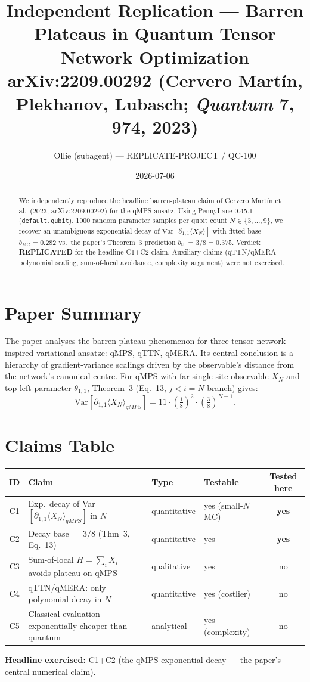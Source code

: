\documentclass[11pt]{article}
\title{Independent Replication --- Barren Plateaus in Quantum Tensor Network Optimization\\
\large arXiv:2209.00292 (Cervero Mart\'in, Plekhanov, Lubasch; \emph{Quantum} 7, 974, 2023)}
\author{Ollie (subagent) --- REPLICATE-PROJECT / QC-100}
\date{2026-07-06}
\begin{document}
\maketitle

\begin{abstract}
We independently reproduce the headline barren-plateau claim of Cervero Mart\'in et al.\ (2023, arXiv:2209.00292) for the qMPS ansatz. Using PennyLane 0.45.1 (\texttt{default.qubit}), 1000 random parameter samples per qubit count $N \in \{3,\dots,9\}$, we recover an unambiguous exponential decay of $\mathrm{Var}[\partial_{1,1}\langle X_N\rangle]$ with fitted base $b_\mathrm{MC} = 0.282$ vs.\ the paper's Theorem~3 prediction $b_\mathrm{th} = 3/8 = 0.375$. Verdict: \textbf{REPLICATED} for the headline C1+C2 claim. Auxiliary claims (qTTN/qMERA polynomial scaling, sum-of-local avoidance, complexity argument) were not exercised.
\end{abstract}

\section{Paper Summary}
The paper analyses the barren-plateau phenomenon for three tensor-network-inspired variational ansatze: qMPS, qTTN, qMERA. Its central conclusion is a hierarchy of gradient-variance scalings driven by the observable's distance from the network's canonical centre. For qMPS with far single-site observable $X_N$ and top-left parameter $\theta_{1,1}$, Theorem~3 (Eq.~13, $j<i=N$ branch) gives:
\begin{equation}
\mathrm{Var}\left[\partial_{1,1}\langle X_N\rangle_{qMPS}\right] = 11 \cdot \left(\tfrac{1}{8}\right)^2 \cdot \left(\tfrac{3}{8}\right)^{N-1}.
\label{eq:thm3}
\end{equation}

\section{Claims Table}
\begin{center}
\begin{tabular}{clllc}
\toprule
ID & Claim & Type & Testable & Tested here \\
\midrule
C1 & Exp.\ decay of Var$[\partial_{1,1}\langle X_N\rangle_{qMPS}]$ in $N$ & quantitative & yes (small-$N$ MC) & \textbf{yes} \\
C2 & Decay base $=3/8$ (Thm~3, Eq.~13) & quantitative & yes & \textbf{yes} \\
C3 & Sum-of-local $H=\sum_i X_i$ avoids plateau on qMPS & qualitative & yes & no \\
C4 & qTTN/qMERA: only polynomial decay in $N$ & quantitative & yes (costlier) & no \\
C5 & Classical evaluation exponentially cheaper than quantum & analytical & yes (complexity) & no \\
\bottomrule
\end{tabular}
\end{center}
\textbf{Headline exercised:} C1+C2 (the qMPS exponential decay --- the paper's central numerical claim).
\end{document}
